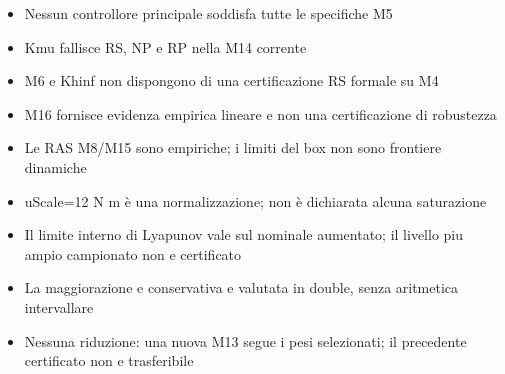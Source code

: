 \begin{itemize}
\item Nessun controllore principale soddisfa tutte le specifiche M5
\item Kmu fallisce RS, NP e RP nella M14 corrente
\item M6 e Khinf non dispongono di una certificazione RS formale su M4
\item M16 fornisce evidenza empirica lineare e non una certificazione di robustezza
\item Le RAS M8/M15 sono empiriche; i limiti del box non sono frontiere dinamiche
\item uScale=12 N m è una normalizzazione; non è dichiarata alcuna saturazione
\item Il limite interno di Lyapunov vale sul nominale aumentato; il livello piu ampio campionato non e certificato
\item La maggiorazione e conservativa e valutata in double, senza aritmetica intervallare
\item Nessuna riduzione: una nuova M13 segue i pesi selezionati; il precedente certificato non e trasferibile
\end{itemize}
